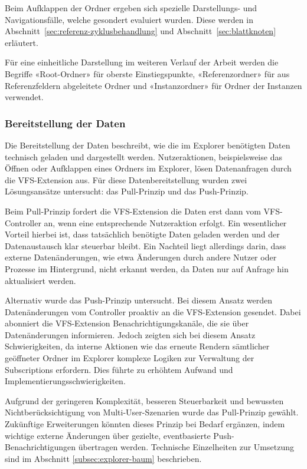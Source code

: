 Beim Aufklappen der Ordner ergeben sich spezielle Darstellungs- und Navigationsfälle, welche gesondert evaluiert wurden. Diese werden in Abschnitt~\ref{sec:referenz-zyklusbehandlung} und Abschnitt~\ref{sec:blattknoten} erläutert.

Für eine einheitliche Darstellung im weiteren Verlauf der Arbeit werden die Begriffe «Root-Ordner» für oberste Einstiegspunkte, «Referenzordner» für aus Referenzfeldern abgeleitete Ordner und «Instanzordner» für Ordner der Instanzen verwendet.

\newpage
\subsubsection*{Bereitstellung der Daten}
Die Bereitstellung der Daten beschreibt, wie die im Explorer benötigten Daten technisch geladen und dargestellt werden. Nutzeraktionen, beispielsweise das Öffnen oder Aufklappen eines Ordners im Explorer, lösen Datenanfragen durch die VFS-Extension aus. Für diese Datenbereitstellung wurden zwei Lösungsansätze untersucht: das Pull-Prinzip und das Push-Prinzip.

Beim Pull-Prinzip fordert die VFS-Extension die Daten erst dann vom VFS-Controller an, wenn eine entsprechende Nutzeraktion erfolgt. Ein wesentlicher Vorteil hierbei ist, dass tatsächlich benötigte Daten geladen werden und der Datenaustausch klar steuerbar bleibt. Ein Nachteil liegt allerdings darin, dass externe Datenänderungen, wie etwa Änderungen durch andere Nutzer oder Prozesse im Hintergrund, nicht erkannt werden, da Daten nur auf Anfrage hin aktualisiert werden.

Alternativ wurde das Push-Prinzip untersucht. Bei diesem Ansatz werden Datenänderungen vom Controller proaktiv an die VFS-Extension gesendet. Dabei abonniert die VFS-Extension Benachrichtigungskanäle, die sie über Datenänderungen informieren. Jedoch zeigten sich bei diesem Ansatz Schwierigkeiten, da interne Aktionen wie das erneute Rendern sämtlicher geöffneter Ordner im Explorer komplexe Logiken zur Verwaltung der Subscriptions erfordern. Dies führte zu erhöhtem Aufwand und Implementierungsschwierigkeiten.

Aufgrund der geringeren Komplexität, besseren Steuerbarkeit und bewussten Nichtberücksichtigung von Multi-User-Szenarien wurde das Pull-Prinzip gewählt. Zukünftige Erweiterungen könnten dieses Prinzip bei Bedarf ergänzen, indem wichtige externe Änderungen über gezielte, eventbasierte Push-Benachrichtigungen übertragen werden. Technische Einzelheiten zur Umsetzung sind im Abschnitt \ref{subsec:explorer-baum} beschrieben.


